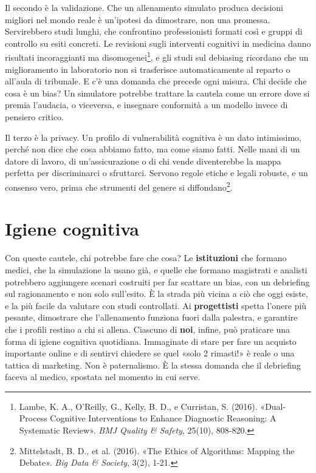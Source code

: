 Il secondo è la validazione. Che un allenamento simulato produca decisioni migliori nel mondo reale è un'ipotesi da dimostrare, non una promessa. Servirebbero studi lunghi, che confrontino professionisti formati così e gruppi di controllo su esiti concreti. Le revisioni sugli interventi cognitivi in medicina danno risultati incoraggianti ma disomogenei\footnote{Lambe, K. A., O'Reilly, G., Kelly, B. D., e Curristan, S. (2016). «Dual-Process Cognitive Interventions to Enhance Diagnostic Reasoning: A Systematic Review». \textit{BMJ Quality \& Safety}, 25(10), 808-820.}, e gli studi sul debiasing ricordano che un miglioramento in laboratorio non si trasferisce automaticamente al reparto o all'aula di tribunale. E c'è una domanda che precede ogni misura. Chi decide che cosa è un bias? Un simulatore potrebbe trattare la cautela come un errore dove si premia l'audacia, o viceversa, e insegnare conformità a un modello invece di pensiero critico.

Il terzo è la privacy. Un profilo di vulnerabilità cognitiva è un dato intimissimo, perché non dice che cosa abbiamo fatto, ma come siamo fatti. Nelle mani di un datore di lavoro, di un'assicurazione o di chi vende diventerebbe la mappa perfetta per discriminarci o sfruttarci. Servono regole etiche e legali robuste, e un consenso vero, prima che strumenti del genere si diffondano\footnote{Mittelstadt, B. D., et al. (2016). «The Ethics of Algorithms: Mapping the Debate». \textit{Big Data \& Society}, 3(2), 1-21.}.

\section{Igiene cognitiva}
\label{sec:p4c33-igiene-cognitiva-oltre}
Con queste cautele, chi potrebbe fare che cosa? Le \textbf{istituzioni} che formano medici, che la simulazione la usano già, e quelle che formano magistrati e analisti potrebbero aggiungere scenari costruiti per far scattare un bias, con un debriefing sul ragionamento e non solo sull'esito. È la strada più vicina a ciò che oggi esiste, e la più facile da valutare con studi controllati. Ai \textbf{progettisti} spetta l'onere più pesante, dimostrare che l'allenamento funziona fuori dalla palestra, e garantire che i profili restino a chi si allena. Ciascuno di \textbf{noi}, infine, può praticare una forma di igiene cognitiva quotidiana. Immaginate di stare per fare un acquisto importante online e di sentirvi chiedere se quel «solo 2 rimasti!» è reale o una tattica di marketing. Non è paternalismo. È la stessa domanda che il debriefing faceva al medico, spostata nel momento in cui serve.

